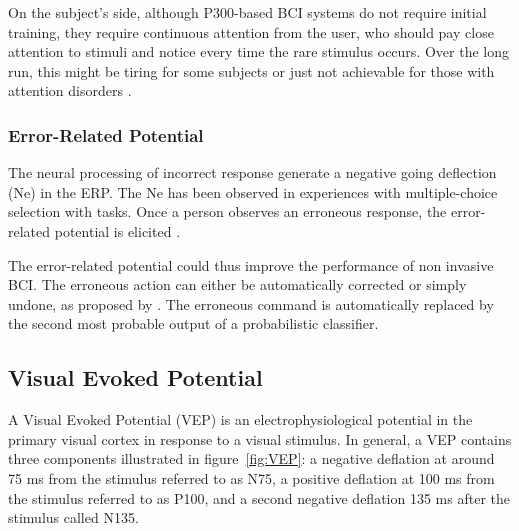 \par
On the subject's side, although P300-based BCI systems do not require initial training, they require continuous attention from the user, who should pay close attention to stimuli and notice every time the rare stimulus occurs. 
Over the long run, this might be tiring for some subjects or just not achievable for those with attention disorders \citep{szuromi_p300_2010, krusienski_toward_2008}. 

\subsubsection{Error-Related Potential}

The neural processing of incorrect response generate a negative going deflection (Ne) in the ERP.
The Ne has been observed in experiences with multiple-choice selection with tasks. Once a person observes an erroneous response, the error-related potential is elicited \citep{gehring_neural_1993}.

The error-related potential could thus improve the performance of non invasive BCI.
The erroneous action can either be automatically corrected or simply undone, as proposed by \cite{margaux_objective_2012}. The erroneous command is automatically replaced by the second most probable output of a probabilistic classifier.  
    
\label{errp}
\goodbreak
\subsection{Visual Evoked Potential}
\label{subsec:vep}


A Visual Evoked Potential (VEP) is an electrophysiological potential in the primary visual cortex in response to a visual stimulus. 
In general, a VEP contains three components illustrated in figure~\ref{fig:VEP}: a negative deflation at around 75 ms from the stimulus referred to as N75, a positive deflation at 100 ms from the stimulus referred to as P100, and a second negative deflation 135 ms after the stimulus called N135.


